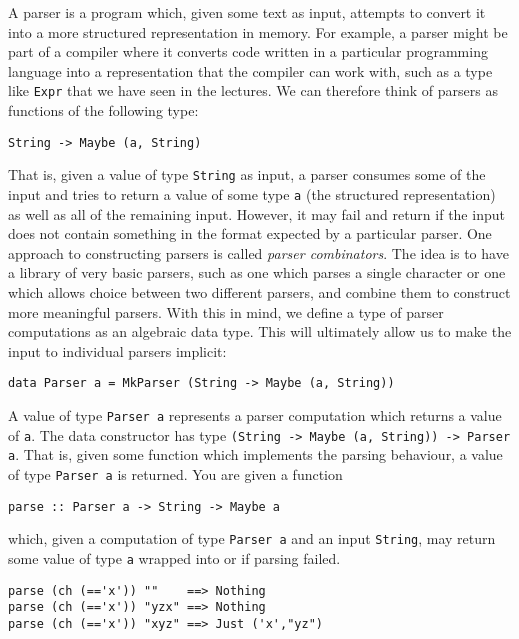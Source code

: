 A parser is a program which, given some text as input, attempts to convert it into a more structured representation in memory. For example, a parser might be part of a compiler where it converts code written in a particular programming language into a representation that the compiler can work with, such as a type like \texttt{\small Expr} that we have seen in the lectures. We can therefore think of parsers as functions of the following type:
\begin{center}
	\texttt{\small String -> Maybe (a, String)}
\end{center}
That is, given a value of type \texttt{\small String} as input, a parser consumes some of the input and tries to return a value of some type \texttt{\small a} (the structured representation) as well as all of the remaining input. However, it may fail and return  if the input does not contain something in the format expected by a particular parser. One approach to constructing parsers is called \emph{parser combinators}. The idea is to have a library of very basic parsers, such as one which parses a single character or one which allows choice between two different parsers, and combine them to construct more meaningful parsers. With this in mind, we define a type of parser computations as an algebraic data type. This will ultimately allow us to make the input to individual parsers implicit:
\begin{verbatim}
data Parser a = MkParser (String -> Maybe (a, String))
\end{verbatim}
A value of type \texttt{\small Parser a} represents a parser computation which returns a value of \texttt{\small a}. The  data constructor has type \texttt{\small (String -> Maybe (a, String)) -> Parser a}. That is, given some function which implements the parsing behaviour, a value of type \texttt{\small Parser a} is returned. You are given a function
\begin{verbatim}
parse :: Parser a -> String -> Maybe a
\end{verbatim}
which, given a computation of type \texttt{\small Parser a} and an input \texttt{\small String}, may return some value of type \texttt{\small a} wrapped into  or  if parsing failed.

\taskLine 

\begin{verbatim}
parse (ch (=='x')) ""    ==> Nothing
parse (ch (=='x')) "yzx" ==> Nothing
parse (ch (=='x')) "xyz" ==> Just ('x',"yz")
\end{verbatim}

